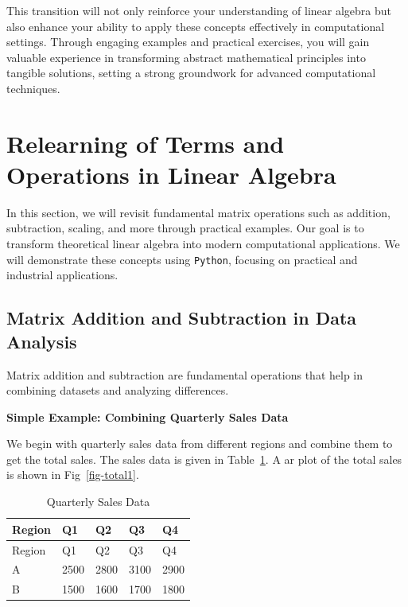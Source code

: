 \documentclass[
  letterpaper,
  DIV=11,
  numbers=noendperiod]{scrreprt}
\theoremstyle{plain}
\theoremstyle{definition}
\theoremstyle{remark}
\begin{document}
This transition will not only reinforce your understanding of linear
algebra but also enhance your ability to apply these concepts
effectively in computational settings. Through engaging examples and
practical exercises, you will gain valuable experience in transforming
abstract mathematical principles into tangible solutions, setting a
strong groundwork for advanced computational techniques.

\section{Relearning of Terms and Operations in Linear
Algebra}\label{relearning-of-terms-and-operations-in-linear-algebra}

In this section, we will revisit fundamental matrix operations such as
addition, subtraction, scaling, and more through practical examples. Our
goal is to transform theoretical linear algebra into modern
computational applications. We will demonstrate these concepts using
\texttt{Python}, focusing on practical and industrial applications.

\subsection{Matrix Addition and Subtraction in Data
Analysis}\label{matrix-addition-and-subtraction-in-data-analysis}

Matrix addition and subtraction are fundamental operations that help in
combining datasets and analyzing differences.

\textbf{Simple Example: Combining Quarterly Sales Data}

We begin with quarterly sales data from different regions and combine
them to get the total sales. The sales data is given in
Table~\ref{tbl-qtb}. A ar plot of the total sales is shown in
Fig~\ref{fig-total1}.

\begin{longtable}[]{@{}lllll@{}}
\caption{Quarterly Sales Data}\label{tbl-qtb}\tabularnewline
\toprule\noalign{}
Region & Q1 & Q2 & Q3 & Q4 \\
\midrule\noalign{}
\endfirsthead
\toprule\noalign{}
Region & Q1 & Q2 & Q3 & Q4 \\
\midrule\noalign{}
\endhead
\bottomrule\noalign{}
\endlastfoot
A & 2500 & 2800 & 3100 & 2900 \\
B & 1500 & 1600 & 1700 & 1800 \\
\end{longtable}
\end{document}
